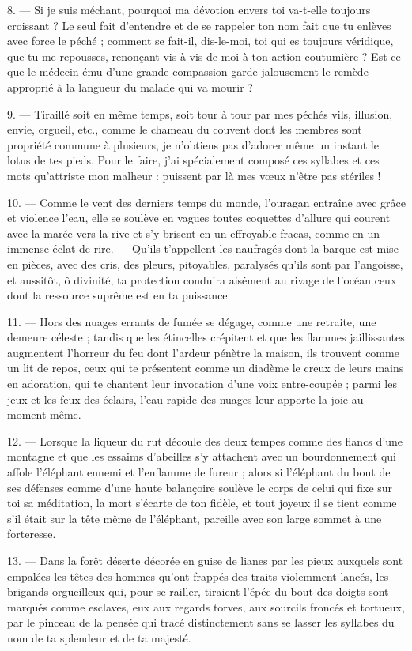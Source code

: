 \documentclass[a4paper, 11pt, oneside, french]{article}
\begin{document}
8. --- Si je suis méchant, pourquoi ma dévotion envers toi va-t-elle toujours croissant ? Le seul fait d'entendre et de se rappeler ton nom fait que tu enlèves avec force le péché ; comment se fait-il, dis-le-moi, toi qui es toujours véridique, que tu me repousses, renonçant vis-à-vis de moi à ton action coutumière ? Est-ce que le médecin ému d'une grande compassion garde jalousement le remède approprié à la langueur du malade qui va mourir ?

9. --- Tiraillé soit en même temps, soit tour à tour par mes péchés vils, illusion, envie, orgueil, etc., comme le chameau du couvent dont les membres sont propriété commune à plusieurs, je n'obtiens pas d'adorer même un instant le lotus de tes pieds. Pour le faire, j'ai spécialement composé ces syllabes et ces mots qu'attriste mon malheur : puissent par là mes vœux n'être pas stériles !

10. --- Comme le vent des derniers temps du monde, l'ouragan entraîne avec grâce et violence l'eau, elle se soulève en vagues toutes coquettes d'allure qui courent avec la marée vers la rive et s'y brisent en un effroyable fracas, comme en un immense éclat de rire. --- Qu'ils t'appellent les naufragés dont la barque est mise en pièces, avec des cris, des pleurs, pitoyables, paralysés qu'ils sont par l'angoisse, et aussitôt, ô divinité, ta protection conduira aisément au rivage de l'océan ceux dont la ressource suprême est en ta puissance.

11. --- Hors des nuages errants de fumée se dégage, comme une retraite, une demeure céleste ; tandis que les étincelles crépitent et que les flammes jaillissantes augmentent l'horreur du feu dont l'ardeur pénètre la maison, ils trouvent comme un lit de repos, ceux qui te présentent comme un diadème le creux de leurs mains en adoration, qui te chantent leur invocation d'une voix entre-coupée ; parmi les jeux et les feux des éclairs, l'eau rapide des nuages leur apporte la joie au moment même.

12. --- Lorsque la liqueur du rut découle des deux tempes comme des flancs d'une montagne et que les essaims d'abeilles s'y attachent avec un bourdonnement qui affole l'éléphant ennemi et l'enflamme de fureur ; alors si l'éléphant du bout de ses défenses comme d'une haute balançoire soulève le corps de celui qui fixe sur toi sa méditation, la mort s'écarte de ton fidèle, et tout joyeux il se tient comme s'il était sur la tête même de l'éléphant, pareille avec son large sommet à une forteresse.

13. --- Dans la forêt déserte décorée en guise de lianes par les pieux auxquels sont empalées les têtes des hommes qu'ont frappés des traits violemment lancés, les brigands orgueilleux qui, pour se railler, tiraient l'épée du bout des doigts sont marqués comme esclaves, eux aux regards torves, aux sourcils froncés et tortueux, par le pinceau de la pensée qui tracé distinctement sans se lasser les syllabes du nom de ta splendeur et de ta majesté.
\end{document}
